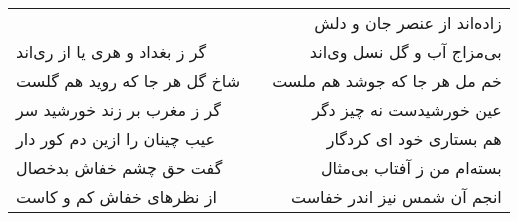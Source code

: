 \begin{center}
\begin{longtable}{l p{0.5cm} r}
&&
زاده‌اند از عنصر جان و دلش
\\
گر ز بغداد و هری یا از ری‌اند
&&
بی‌مزاج آب و گل نسل وی‌اند
\\
شاخ گل هر جا که روید هم گلست
&&
خم مل هر جا که جوشد هم ملست
\\
گر ز مغرب بر زند خورشید سر
&&
عین خورشیدست نه چیز دگر
\\
عیب چینان را ازین دم کور دار
&&
هم بستاری خود ای کردگار
\\
گفت حق چشم خفاش بدخصال
&&
بسته‌ام من ز آفتاب بی‌مثال
\\
از نظرهای خفاش کم و کاست
&&
انجم آن شمس نیز اندر خفاست
\\
\end{longtable}
\end{center}

